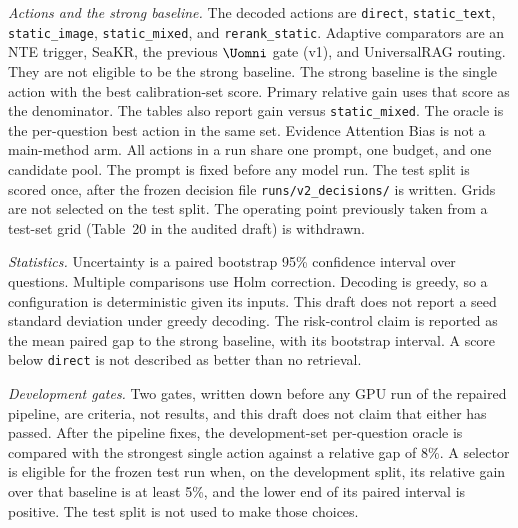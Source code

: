 \textit{Actions and the strong baseline.}
The decoded actions are \texttt{direct}, \texttt{static\_text}, \texttt{static\_image}, \texttt{static\_mixed}, and \texttt{rerank\_static}.
Adaptive comparators are an NTE trigger, SeaKR, the previous $\Uomni$ gate (v1), and UniversalRAG routing.
They are not eligible to be the strong baseline.
The strong baseline is the single action with the best calibration-set score.
Primary relative gain uses that score as the denominator.
The tables also report gain versus \texttt{static\_mixed}.
The oracle is the per-question best action in the same set.
Evidence Attention Bias is not a main-method arm.
All actions in a run share one prompt, one budget, and one candidate pool.
The prompt is fixed before any model run.
The test split is scored once, after the frozen decision file \texttt{runs/v2\_decisions/} is written.
Grids are not selected on the test split.
The operating point previously taken from a test-set grid (Table~20 in the audited draft) is withdrawn.

\textit{Statistics.}
Uncertainty is a paired bootstrap 95\% confidence interval over questions.
Multiple comparisons use Holm correction.
Decoding is greedy, so a configuration is deterministic given its inputs.
This draft does not report a seed standard deviation under greedy decoding.
The risk-control claim is reported as the mean paired gap to the strong baseline, with its bootstrap interval.
A score below \texttt{direct} is not described as better than no retrieval.

\textit{Development gates.}
Two gates, written down before any GPU run of the repaired pipeline, are criteria, not results, and this draft does not claim that either has passed.
After the pipeline fixes, the development-set per-question oracle is compared with the strongest single action against a relative gap of 8\%.
A selector is eligible for the frozen test run when, on the development split, its relative gain over that baseline is at least 5\%, and the lower end of its paired interval is positive.
The test split is not used to make those choices.

